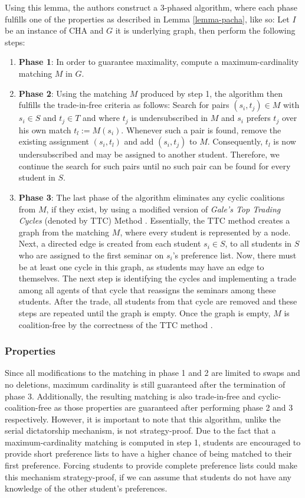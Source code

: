 Using this lemma, the authors \cite{SngThesis, Abraham:Pacha} construct a 3-phased algorithm, where each phase fulfills one of the properties as described in Lemma \ref{lemma-pacha}, like so: Let $I$ be an instance of CHA and $G$ it is underlying graph, then perform the following steps:
\begin{enumerate}
    \item \textbf{Phase 1}: In order to guarantee maximality, compute a maximum-cardinality matching $M$ in $G$.
    \item \textbf{Phase 2}: Using the matching $M$ produced by step 1, the algorithm then fulfills the trade-in-free criteria as follows: Search for pairs $(s_i, t_j) \in M$ with $s_i \in S$ and $t_j \in T$ and where $t_j$ is undersubscribed in $M$ and $s_i$ prefers $t_j$ over his own match $t_l := M(s_i)$. Whenever such a pair is found, remove the existing assignment $(s_i, t_l)$ and add $(s_i, t_j)$ to $M$. Consequently, $t_l$ is now undersubscribed and may be assigned to another student. Therefore, we continue the search for such pairs until no such pair can be found for every student in $S$.
    \item \textbf{Phase 3}: The last phase of the algorithm eliminates any cyclic coalitions from $M$, if they exist, by using a modified version of \emph{Gale's Top Trading Cycles} (denoted by TTC) Method \cite{ShapleyTTC}. Essentially, the TTC method creates a graph from the matching $M$, where every student is represented by a node. Next, a directed edge is created from each student $s_i \in S$, to all students in $S$ who are assigned to the first seminar on $s_i$'s preference list. Now, there must be at least one cycle in this graph, as students may have an edge to themselves. The next step is identifying the cycles and implementing a trade among all agents of that cycle that reassigns the seminars among these students. After the trade, all students from that cycle are removed and these steps are repeated until the graph is empty. Once the graph is empty, $M$ is coalition-free by the correctness of the TTC method \cite{Abraham:Pacha}.
\end{enumerate}

\subsubsection{Properties}
Since all modifications to the matching in phase 1 and 2 are limited to swaps and no deletions, maximum cardinality is still guaranteed after the termination of phase 3. Additionally, the resulting matching is also trade-in-free and cyclic-coalition-free as those properties are guaranteed after performing phase 2 and 3 respectively. However, it is important to note that this algorithm, unlike the serial dictatorship mechanism, is not strategy-proof. Due to the fact that a maximum-cardinality matching is computed in step 1, students are encouraged to provide short preference lists to have a higher chance of being matched to their first preference. Forcing students to provide complete preference lists could make this mechanism strategy-proof, if we can assume that students do not have any knowledge of the other student's preferences.

